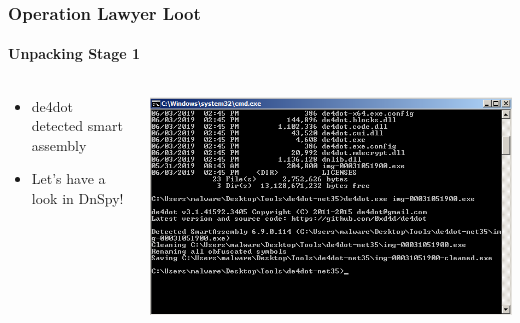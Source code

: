 \documentclass[aspectratio=169]{beamer}
\begin{document}
{
\begin{frame}
  \frametitle{Operation Lawyer Loot}
  \framesubtitle{Unpacking Stage 1}
  \begin{columns}
    \begin{column}{.3\textwidth}
      \begin{itemize}
      \item{de4dot detected smart assembly}
      \item{Let's have a look in DnSpy!}
      \end{itemize}
    \end{column}
    \hfill
    \begin{column}{.7\textwidth}
      \begin{center}
        \includegraphics[scale=1.75]{kpot-unpacking-3}
      \end{center}
    \end{column}
  \end{columns}
\end{frame}
}
\end{document}
